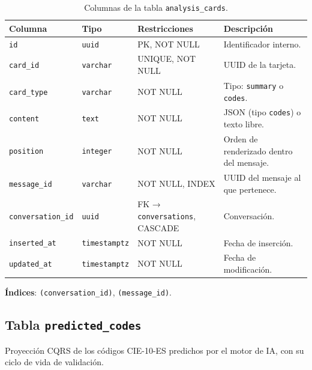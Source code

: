 \begin{table}[h]
\centering
\caption{Columnas de la tabla \texttt{analysis\_cards}.}
\label{tab:cards}
\begin{tabular}{llp{3.5cm}p{4.5cm}}
\hline
\textbf{Columna} & \textbf{Tipo} & \textbf{Restricciones} & \textbf{Descripción} \\
\hline
\texttt{id}               & \texttt{uuid}    & PK, NOT NULL           & Identificador interno. \\
\texttt{card\_id}         & \texttt{varchar} & UNIQUE, NOT NULL       & UUID de la tarjeta. \\
\texttt{card\_type}       & \texttt{varchar} & NOT NULL               & Tipo: \texttt{summary} o \texttt{codes}. \\
\texttt{content}          & \texttt{text}    & NOT NULL               & JSON (tipo \texttt{codes}) o texto libre. \\
\texttt{position}         & \texttt{integer} & NOT NULL               & Orden de renderizado dentro del mensaje. \\
\texttt{message\_id}      & \texttt{varchar} & NOT NULL, INDEX        & UUID del mensaje al que pertenece. \\
\texttt{conversation\_id} & \texttt{uuid}    & FK → \texttt{conversations}, CASCADE & Conversación. \\
\texttt{inserted\_at}     & \texttt{timestamptz} & NOT NULL           & Fecha de inserción. \\
\texttt{updated\_at}      & \texttt{timestamptz} & NOT NULL           & Fecha de modificación. \\
\hline
\end{tabular}
\end{table}

\textbf{Índices}: \texttt{(conversation\_id)}, \texttt{(message\_id)}.

\subsection{Tabla \texttt{predicted\_codes}}

Proyección CQRS de los códigos CIE-10-ES predichos por el motor de IA, con su ciclo de vida de validación.

